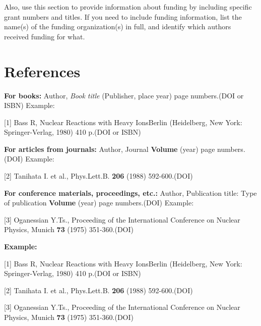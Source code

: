 \documentclass[12pt,a4paper,twoside]{article}
\begin{document}
Also, use this section to provide information about funding by including specific grant numbers and titles. If you need to include funding information, list the name(s) of the funding organization(s) in full, and identify which authors received funding for what.

\section*{References }

\textbf{For books: }
Author, \textit{Book title} (Publisher, place year) page numbers.(DOI or ISBN) Example:

[1]	Bass R, Nuclear Reactions with Heavy IonsBerlin (Heidelberg, New York: Springer-Verlag, 1980) 410 p.(DOI or ISBN)

\textbf{For articles from journals:}
Author, Journal \textbf{Volume} (year) page numbers.(DOI) Example:

[2] Tanihata I. et al., Phys.Lett.B. \textbf{206} (1988) 592-600.(DOI)

\textbf{For conference materials, proceedings, etc.:}
Author, Publication title: Type of publication \textbf{Volume} (year) page numbers.(DOI) Example:

[3] Oganessian Y.Ts., Proceeding of the International Conference on Nuclear Physics, Munich \textbf{73} (1975) 351-360.(DOI)

\begin{flushleft}
\textbf{Example: }


[1] Bass R, Nuclear Reactions with Heavy IonsBerlin (Heidelberg, New York: Springer-Verlag, 1980) 410 p.(DOI or ISBN)

[2] Tanihata I. et al., Phys.Lett.B. \textbf{206} (1988) 592-600.(DOI)

[3] Oganessian Y.Ts., Proceeding of the International Conference on Nuclear Physics, Munich \textbf{73} (1975) 351-360.(DOI)

\end{flushleft}
\end{document}
